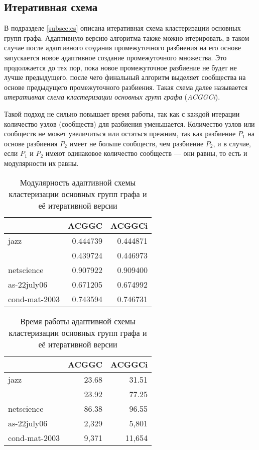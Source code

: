 
\subsection{Итеративная схема}

В подразделе \ref{subsec:es} описана итеративная схема кластеризации основных групп графа. Адаптивную версию алгоритма также можно итерировать, в таком случае после адаптивного создания промежуточного разбиения на его основе запускается новое адаптивное создание промежуточного множества. Это продолжается до тех пор, пока новое промежуточное разбиение не будет не лучше предыдущего, после чего финальный алгоритм выделяет сообщества на основе предыдущего промежуточного разбиения. Такая схема далее называется \emph{итеративная схема кластеризации основных групп графа} (\emph{ACGGCi}).

Такой подход не сильно повышает время работы, так как с каждой итерации количество узлов (сообществ) для разбиения уменьшается. Количество узлов или сообществ не может увеличиться или остаться прежним, так как разбиение $P_1$ на основе разбиения $P_2$ имеет не больше сообществ, чем разбиение $P_2$, и в случае, если $P_1$ и $P_2$ имеют одинаковое количество сообществ --- они равны, то есть и модулярности их равны.

\begin{multicols}{2}
\begin{table}[H]
	\caption{Модулярность адаптивной схемы кластеризации основных групп графа и её итеративной версии}
	\label{tab-es-iter-q}
	\begin{tabularx}{\columnwidth}{Xrr}\hline
					& \multicolumn{1}{c}{ACGGC}	& \multicolumn{1}{c}{ACGGCi} \\\hline
	jazz 			& 0.444739	& 0.444871	\\
	\celegans 		& 0.439724	& 0.446973	\\
	netscience 		& 0.907922	& 0.909400	\\
	as-22july06		& 0.671205	& 0.674992	\\
	cond-mat-2003	& 0.743594	& 0.746731	\\
	\hline
	\end{tabularx}
\end{table}
\begin{table}[H]
	\caption{Время работы адаптивной схемы кластеризации основных групп графа и её итеративной версии}
	\label{tab-es-iter-t}
	\begin{tabularx}{\columnwidth}{lrr}\hline
					& \multicolumn{1}{c}{ACGGC}	& \multicolumn{1}{c}{ACGGCi} \\\hline
	jazz 			& 23.68		& 31.51		\\
	\celegans 		& 23.92		& 77.25		\\
	netscience 		& 86.38		& 96.55		\\
	as-22july06		& 2,329		& 5,801		\\
	cond-mat-2003	& 9,371		& 11,654	\\
	\hline
	\end{tabularx}
\end{table}
\end{multicols}

